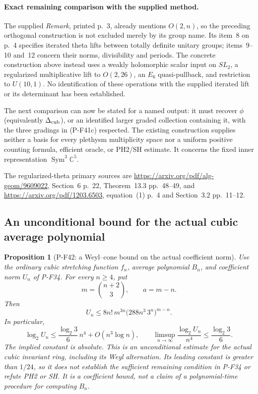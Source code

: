 \documentclass[11pt,a4paper]{article}
\newtheorem{proposition}{Proposition}[section]
\begin{document}
\paragraph{Exact remaining comparison with the supplied method.}
The supplied \emph{Remark}, printed p.~3, already mentions
$O(2,n)$, so the preceding orthogonal construction is not
excluded merely by its group name. Its item~8 on p.~4
specifies iterated theta lifts between totally definite
unitary groups; items~9--10 and~12 concern their norms,
divisibility and periods. The concrete construction above
instead uses a weakly holomorphic scalar input on $SL_2$,
a regularized multiplicative lift to $O(2,26)$, an $E_6$
quasi-pullback, and restriction to $U(10,1)$.
No identification of these operations with the supplied
iterated lift or its determinant has been established.

The next comparison can now be stated for a named output:
it must recover $\phi$ (equivalently $\Delta_{\rm cub}$),
or an identified larger graded collection containing it,
with the three gradings in (P-F41c) respected.
The existing construction supplies neither a basis for
every plethysm multiplicity space nor a uniform positive
counting formula, efficient oracle, or PH2/SH estimate.
It concerns the fixed inner representation
$\operatorname{Sym}^3\mathbb C^5$.

The regularized-theta primary sources are
\url{https://arxiv.org/pdf/alg-geom/9609022}, Section~6 p.~22,
Theorem~13.3 pp.~48--49, and
\url{https://arxiv.org/pdf/1203.6503}, equation~(1) p.~4
and Section~3.2 pp.~11--12.


\subsection{An unconditional bound for the actual cubic average polynomial}

\begin{proposition}[P-F42: a Weyl--cone bound on the actual coefficient norm]
\label{prop:cubicaverageupper}
Use the ordinary cubic stretching function $f_n$, average polynomial
$B_n$, and coefficient norm $U_n$ of P-F34. For every $n\ge4$, put
\[
 m=\binom{n+2}{3},\qquad a=m-n.
\]
Then
\[
 U_n\le
 8n!\,m^{3n}\bigl(288n^3\,3^n\bigr)^{m-n}.
 \tag{P-F42a}
\]
In particular,
\[
 \log_2 U_n\le
 \frac{\log_2 3}{6}\,n^4+O(n^3\log n),\qquad
 \limsup_{n\longrightarrow\infty}
       \frac{\log_2 U_n}{n^4}
       \le\frac{\log_2 3}{6}.
 \tag{P-F42b}
\]
The implied constant is absolute. This is an unconditional estimate
for the actual cubic invariant ring, including its Weyl alternation.
Its leading constant is greater than $1/24$, so it does not establish
the sufficient remaining condition in P-F34 or refute PH2 or SH.
It is a coefficient bound, not a claim of a polynomial-time procedure
for computing $B_n$.
\end{proposition}
\end{document}
